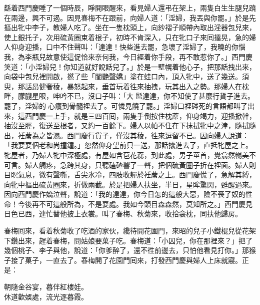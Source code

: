 繇着西門慶睡了一個時辰，睜開眼醒來，看見婦人還弔在架上，兩隻白生生腿兒蹺在兩邊，興不可遏。{}因見春梅不在跟前，向婦人道：「淫婦，我丟與你罷。」{}於是先摳出牝中李子，教婦人吃了。{}坐在一隻枕頭上，向紗褶子順帶內取出淫器包兒來，使上銀托子，次用硫黃圈束着根子，初時不肯深入，只在牝口子來囘擂晃，急的婦人仰身迎播，口中不住聲叫：「達達！快些進去罷，急壞了淫婦了，我曉的你惱我，為李瓶兒故意使這促恰來奈何我，今日經着你手段，再不敢惹你了。」{}西門慶笑道：「小淫婦兒！你知道就好說話兒了。」於是一壁幌着他心子，把那話拽出來，向袋中包兒裡開啟，撚了些「閨艷聲嬌」塗在蛙口內，頂入牝中，送了幾送。須臾，那話昂健奢稜，暴怒起來，垂首玩着徃來抽拽，玩其出入之勢。那婦人在枕畔，朦朧星眼，呻吟不已，沒口子叫：「大𩫻䯲達達，你不知使了甚麼行貨子進去。罷了，淫婦的𣭈心癢到骨髓裡去了。可憐見饒了罷。」淫婦口裡硶死的言語都叫了出來，這西門慶一上手，就是三四百囘，兩隻手倒按住枕蓆，仰身竭力，迎播掀幹，抽沒至脛，復送至根者，又約一百餘下。婦人以帕不住在下抹拭牝中之津，隨拭隨出，衽蓆為之皆濕。西門慶行貨子，僅沒其稜，徃來逗留不已。因向婦人說道：「我要耍個老和尚撞鐘。」忽然仰身望前只一送，那話攮進去了，直抵牝屋之上。牝屋者，乃婦人牝中深極處，有屋如含苞花蕊，到此處，男子莖首，覺翕然暢美不可言。婦人觸疼，急跨其身，只聽磕碴響了一聲，把個硫黃圈子折在裡面。婦人則目瞑氣息，微有聲嘶，舌尖氷冷，四肢收軃於衽蓆之上。西門慶慌了，急解其縛，向牝中摳出硫黃圈來，折做兩截。於是把婦人扶坐，半日，星眸驚閃，甦醒過來。因向西門慶作嬌泣聲，{}說道：「我的達達，你今日怎的這般大惡，險不䘮了奴的性命！今後再不可這般所為，不是耍處。我如今頭目森森然，莫知所之。」{}西門慶見日色已西，連忙替他披上衣裳。叫了春梅、秋菊來，收拾衾枕，同扶他歸房。

春梅囘來，看着秋菊收了吃酒的家伙，纔待開花園門，來昭的兒子小鐵棍兒從花架下鑽出來，趕着春梅，問姑娘要菓子吃。春梅道：「小囚兒，你在那裡來？」把了幾個桃子、李子與他，說道：「你爹醉了，還不徃前邊去，只怕他看見打你。」那猴子接了菓子，一直去了。春梅開了花園門囘來，打發西門慶與婦人上床就寢。正是：

\begin{myquote}
朝隨金谷宴，暮伴紅樓娃。\\休道歡娛處，流光逐暮霞。
\end{myquote}

